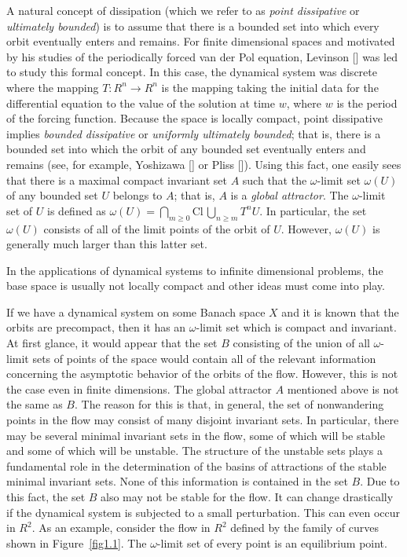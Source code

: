 \documentclass{surv-l}
\theoremstyle{plain}
\theoremstyle{definition}
\numberwithin{equation}{section}
\numberwithin{figure}{chapter}
\begin{document}
A natural concept of dissipation (which we refer to as \emph{point dissipative} or \emph{ultimately bounded}) is to assume that there is a bounded set into which every orbit eventually enters and remains. For finite dimensional spaces and motivated by his studies of the periodically forced van der Pol equation, Levinson [\citeyear{1944l}] was led to study this formal concept. In this case, the dynamical system was discrete where the mapping $T\!:R^{n}\rightarrow R^{n}$ is the mapping taking the initial data for the differential equation to the value of the solution at time $w$, where $w$ is the period of the forcing function. Because the space is locally compact, point dissipative implies \emph{bounded dissipative} or \emph{uniformly ultimately bounded}; that is, there is a bounded set into which the orbit of any bounded set eventually enters and remains (see, for example, Yoshizawa [\citeyear{1966y}] or Pliss [\citeyear{1966p}]). Using this fact, one easily sees that there is a maximal compact invariant set $A$ such that the $\omega$-limit set $\omega(U)$ of any bounded set $U$ belongs to $A$; that is, $A$ is a \emph{global attractor}. The $\omega$-limit set of $U$ is defined as $\omega(U)=\bigcap_{m\geq 0} \mathrm{Cl}\,\bigcup_{n\geq m}T^{n}U$. In particular, the set $\omega(U)$ consists of all of the limit points of the orbit of $U$. However, $\omega(U)$ is generally much larger than this latter set.

In the applications of dynamical systems to infinite dimensional problems, the base space is usually not locally compact and other ideas must come into play.

If we have a dynamical system on some Banach space $X$ and it is known that the orbits are precompact, then it has an $\omega$-limit set which is compact and invariant. At first glance, it would appear that the set $B$ consisting of the union of all $\omega$-limit sets of points of the space would contain all of the relevant information concerning the asymptotic behavior of the orbits of the flow. However, this is not the case even in finite dimensions. The global attractor $A$ mentioned above is not the same as $B$. The reason for this is that, in general, the set of nonwandering points in the flow may consist of many disjoint invariant sets. In particular, there may be several minimal invariant sets in the flow, some of which will be stable and some of which will be unstable. The structure of the unstable sets plays a fundamental role in the determination of the basins of attractions of the stable minimal invariant sets. None of this information is contained in the set $B$. Due to this fact, the set $B$ also may not be stable for the flow. It can change drastically if the dynamical system is subjected to a small perturbation. This can even occur in $R^{2}$. As an example, consider the flow in $R^{2}$ defined by the family of curves shown in Figure~\ref{fig1.1}. The $\omega$-limit set of every point is an equilibrium point.
\end{document}

